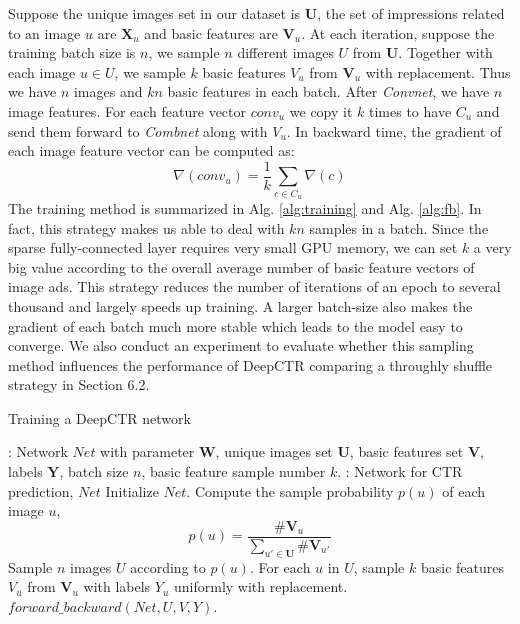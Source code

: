 \documentclass{sig-alternate}
\begin{document}
Suppose the unique  images set in our dataset is $\mathbf{U}$, the set of impressions related to an image $u$ are $\mathbf{X}_{u}$ and basic features are $\mathbf{V}_{u}$. At each iteration, suppose the training batch size is $n$, we sample $n$ different images $U$ from $\mathbf{U}$. Together with each image $u \in U$, we sample $k$ basic features $V_{u}$ from $\mathbf{V}_{u}$ with replacement. Thus we have $n$ images and $kn$ basic features in each batch.   After \emph{Convnet}, we have $n$ image features. For each feature vector $conv_{u}$ we copy it $k$ times to have $C_{u}$ and send them forward to \emph{Combnet} along with $V_{u}$. In backward time, the gradient of each image feature vector can be computed as:
\begin{equation}\label{eq:gradient}
\nabla(conv_{u}) = \frac{1}{k} \sum_{c \in C_{u}} \nabla(c)  
\end{equation}
The training method is summarized in Alg. \ref{alg:training} and Alg. \ref{alg:fb}. In fact, this strategy makes us able to deal with $kn$ samples in a batch. Since the sparse fully-connected layer requires very small GPU memory, we can set $k$ a very big value according to the overall average number of basic feature vectors of image ads. This strategy reduces the number of iterations of an epoch to several thousand and largely  speeds up training. A larger batch-size also makes the gradient of each batch much more stable which leads to the model easy to converge. We also conduct an experiment to evaluate whether this sampling method influences  the performance of DeepCTR comparing a throughly shuffle strategy in Section  6.2.
\begin{algorithm}[tb]
	\caption{Training a DeepCTR network}
	\label{alg:training}
	\begin{algorithmic}[1]
		\renewcommand{\algorithmicrequire}{\textbf{Input:}}
		\renewcommand{\algorithmicensure}{\textbf{Output:}}
		\Require: Network $Net$ with parameter $\mathbf{W}$, unique images set $\mathbf{U}$, basic features set $\mathbf{V}$, labels $\mathbf{Y}$, batch size $n$, basic feature sample number $k$.  
		\Ensure: Network for CTR prediction, $Net$
		\State Initialize $Net$.
		\State Compute the sample probability $p(u)$ of each image $u$,
		\begin{equation}
		p(u) = \frac{\# \mathbf{V}_{u}}{\sum_{u' \in \mathbf{U}} \# \mathbf{V}_{u'}}
		\end{equation}
		\Repeat
		\State Sample $n$ images $U$ according to $p(u)$. 
		\State For each $u$ in $U$, sample $k$ basic features $V_{u}$ from $\mathbf{V}_{u}$ with labels $Y_{u}$ uniformly with replacement. 
		\State $forward\_backward(Net, U, V, Y)$.
	\end{algorithmic}
\end{algorithm}  
\end{document}

